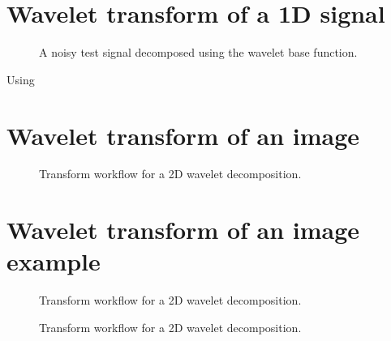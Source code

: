 \documentclass[letterpaper,10pt,english]{sphinxmanual}
\begin{document}
\sphinxAtStartPar
{} 


\section{Wavelet transform of a 1D signal}
\label{\detokenize{02-ImageEnhancement:wavelet-transform-of-a-1d-signal}}
\begin{figure}[htbp]
\centering
\capstart

\noindent{}
\caption{A noisy test signal decomposed using the  wavelet base function.}\label{\detokenize{02-ImageEnhancement:id18}}\end{figure}



\sphinxAtStartPar
Using 


\section{Wavelet transform of an image}
\label{\detokenize{02-ImageEnhancement:wavelet-transform-of-an-image}}
\begin{figure}[htbp]
\centering
\capstart

\noindent{}
\caption{Transform workflow for a 2D wavelet decomposition.}\label{\detokenize{02-ImageEnhancement:id19}}\end{figure}




\section{Wavelet transform of an image \sphinxhyphen{} example}
\label{\detokenize{02-ImageEnhancement:wavelet-transform-of-an-image-example}}
\begin{figure}[htbp]
\centering
\capstart

\noindent{}
\caption{Transform workflow for a 2D wavelet decomposition.}\label{\detokenize{02-ImageEnhancement:id20}}\end{figure}

\begin{figure}[htbp]
\centering
\capstart

\noindent{}
\caption{Transform workflow for a 2D wavelet decomposition.}\label{\detokenize{02-ImageEnhancement:id21}}\end{figure}
\end{document}

